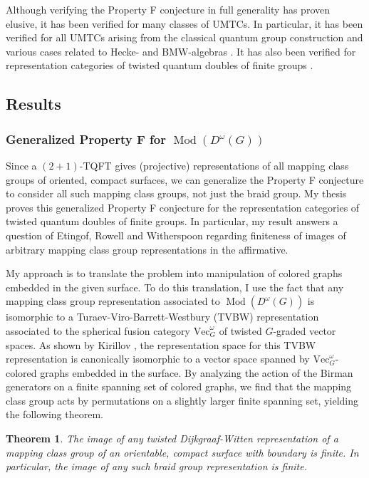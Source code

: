 \documentclass[12pt]{article}
\DeclareMathOperator{\Mod}{Mod}
\newtheorem{theorem}{Theorem}%
\theoremstyle{definition}
\begin{document}
Although verifying the Property F conjecture in full generality has proven elusive, it has been verified for many classes of UMTCs.  In particular, it has been verified for all UMTCs arising from the classical quantum group construction and various cases related to Hecke- and BMW-algebras \cite{FRW, flw, jones86, jonescmp, LRW, r, rw}.  It has also been verified for representation categories of twisted quantum doubles of finite groups \cite{erw}.

\subsection*{Results}
\subsubsection*{Generalized Property F for $\Mod(D^\omega(G))$}

Since a $(2+1)$-TQFT gives (projective) representations of all mapping class groups of oriented, compact surfaces, we can generalize the Property F conjecture to consider all such mapping class groups, not just the braid group. My thesis proves this generalized Property F conjecture for the representation categories of twisted quantum doubles of finite groups.  In particular, my result answers a question of Etingof, Rowell and Witherspoon \cite{erw} regarding finiteness of images of arbitrary mapping class group representations in the affirmative.

My approach is to translate the problem into manipulation of colored graphs embedded in the given surface. To do this translation, I use the fact that any mapping class group representation associated to $\Mod(D^\omega(G))$ is isomorphic to a Turaev-Viro-Barrett-Westbury (TVBW) representation \cite{bw} associated to the spherical fusion category $\text{Vec}_G^\omega$ of twisted $G$-graded vector spaces. As shown by Kirillov \cite{k}, the representation space for this TVBW representation is canonically isomorphic to a vector space spanned by $\text{Vec}_G^\omega$-colored graphs embedded in the surface. By analyzing the action of the Birman generators \cite{birman} on a finite spanning set of colored graphs, we find that the mapping class group acts by permutations on a slightly larger finite spanning set, yielding the following theorem.

\begin{theorem}
The image of any twisted Dijkgraaf-Witten representation of a mapping class group of an orientable, compact surface with boundary is finite.  In particular, the image of any such braid group representation is finite.
\end{theorem}
\end{document}
